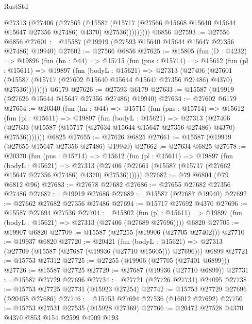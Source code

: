 \begin{lexlean}{RustStd}
\begin{coremodule}
              @27313
                (@27406
                  (@27565
                    (@15587
                      (@15717 (@27566 @15668 @15640 @15644 @15647 @27356 @27486) @4370)
                      @27536)))))))))
    @6856
@27593 := @27556 @6856
@27601 := @15587 (@19919 (@27593 @15640 @15644 @15647 @27356 @27486) @19940)
@27602 := @27566 @6856
@27625 := @15805
    (fun (D : @4232) =>
    @19896
      (fun (hn : @44) =>
      @15715
        (fun (pns : @15714) =>
        @15612
          (fun (pl : @15611) =>
          @19897
            (fun (bodyL : @15621) =>
            @27313
              (@27406
                (@27601
                  (@15587 (@15717 (@27602 @15640 @15644 @15647 @27356 @27486) @4370) @27536))))))))
    @6179
@27626 := @27593 @6179
@27633 := @15587 (@19919 (@27626 @15644 @15647 @27356 @27486) @19940)
@27634 := @27602 @6179
@27654 := @20340
    (fun (hn : @44) =>
    @15715
      (fun (pns : @15714) =>
      @15612
        (fun (pl : @15611) =>
        @19897
          (fun (bodyL : @15621) =>
          @27313
            (@27406
              (@27633 (@15587 (@15717 (@27634 @15644 @15647 @27356 @27486) @4370) @27536)))))))
    @6825
@27655 := @27626 @6825
@27661 := @15587 (@19919 (@27655 @15647 @27356 @27486) @19940)
@27662 := @27634 @6825
@27678 := @20370
    (fun (pns : @15714) =>
    @15612
      (fun (pl : @15611) =>
      @19897
        (fun (bodyL : @15621) =>
        @27313 (@27406 (@27661 (@15587 (@15717 (@27662 @15647 @27356 @27486) @4370) @27536))))))
@27682 := @79 @6804 (@79 @6812 @96)
@27683 := @27678 @27682
@27686 := @27655 @27682 @27356 @27486
@27687 := @19919 @27686
@27689 := @15587 (@27687 @19940)
@27692 := @27662 @27682 @27356 @27486
@27694 := @15717 @27692 @4370
@27696 := @15587 @27694 @27536
@27704 := @15802
    (fun (pl : @15611) => @19897 (fun (bodyL : @15621) => @27313 (@27406 (@27689 @27696))))
    @6820
@27705 := @19907 @6820
@27709 := @15587 (@27255 (@19906 (@27705 @27402)))
@27710 := @19937 @6820
@27720 := @20421
    (fun (bodyL : @15621) => @27313 (@27709 (@15587 (@27687 (@19936 (@27710 @15605))) @27696)))
    @6899
@27721 := @15753 @27312
@27725 := @27255 (@19906 (@27705 (@27401 @6899)))
@27726 := @15587 @27725
@27729 := @27687 (@19936 (@27710 @6899))
@27731 := @15587 @27729 @27696
@27734 := @27721 (@27726 @27731) @24095
@27738 := @15753 @27725 @27731 (@15923 @27254)
@27742 := @15753 @27729 @27696 (@20458 @27686)
@27746 := @15753 @27694 @27536 (@16012 @27692)
@27750 := @15753 @27531 @27535 (@15928 @27369)
@27766 := @20472
    @27528
    @4370
    @4370
    @853
    @154
    @2599
    @4909
    @193

\end{coremodule}
\end{lexlean}
